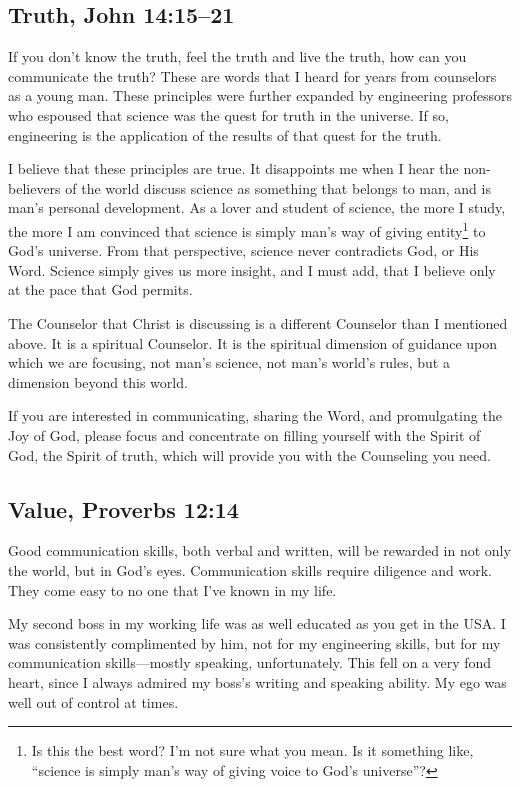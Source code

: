 \documentclass[12pt]{memoir}
\begin{document}
\subsection[Truth]{Truth, John 14:15--21}

If you don't know the truth, feel the truth and live the truth, how
can you communicate the truth? These are words that I heard for years
from counselors as a young man. These principles were further expanded
by engineering professors who espoused that science was the quest for truth in the universe. If so, engineering is the application
of the results of that quest for the truth.

I believe that these principles are true. It disappoints
me when I hear the non-believers of the world discuss science
as something that belongs to man, and is man's personal development.
As a lover and student of science, the more I study, the more I am
convinced that science is simply man's way of giving entity\footnote{Is this the best word? I'm not sure what you mean. Is it something like, ``science is simply man's way of giving voice to God's universe''?} to God's
universe. From that perspective, science never contradicts God, or
His Word. Science simply gives us more insight, and I must add, that
I believe only at the pace that God permits.

The Counselor that Christ is discussing is a different Counselor
than I mentioned above. It is a spiritual Counselor. It is the spiritual
dimension of guidance upon which we are focusing, not man's science,
not man's world's rules, but a dimension beyond this world.

If you are interested in communicating, sharing the Word, and promulgating
the Joy of God, please focus and concentrate on filling yourself with
the Spirit of God, the Spirit of truth, which will provide you with
the Counseling you need.

\subsection[Value]{Value, Proverbs 12:14}

Good communication skills, both verbal and written, will be rewarded
in not only the world, but in God's eyes. Communication skills require
diligence and work. They come easy to no one that I've known in my
life.

My second boss in my working life was as well educated as you get
in the USA. I was consistently complimented by him, not for my engineering
skills, but for my communication skills---mostly speaking, unfortunately.
This fell on a very fond heart, since I always admired my boss's writing
and speaking ability. My ego was well out of control at times.
\end{document}
